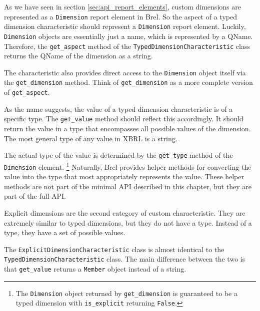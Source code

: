 As we have seen in section \ref{sec:api_report_elements}, custom dimensions are represented as a \texttt{Dimension} report element in Brel.
So the aspect of a typed dimension characteristic should represent a \texttt{Dimension} report element.
Luckily, \texttt{Dimension} objects are essentially just a name, which is represented by a QName.
Therefore, the \texttt{get\_aspect} method of the \texttt{TypedDimensionCharacteristic} class returns the QName of the dimension as a string.

The characteristic also provides direct access to the \texttt{Dimension} object itself via the \texttt{get\_dimension} method.
Think of \texttt{get\_dimension} as a more complete version of \texttt{get\_aspect}.

As the name suggests, the value of a typed dimension characteristic is of a specific type.
The \texttt{get\_value} method should reflect this accordingly.
It should return the value in a type that encompasses all possible values of the dimension.
The most general type of any value in XBRL is a string.

The actual type of the value is determined by the \texttt{get\_type} method of the \texttt{Dimension} element.
\footnote{The \texttt{Dimension} object returned by \texttt{get\_dimension} is guaranteed to be a typed dimension with \texttt{is\_explicit} returning \texttt{False}.}
Naturally, Brel provides helper methods for converting the value into the type that most appropriately represents the value.
These helper methods are not part of the minimal API described in this chapter, but they are part of the full API.

Explicit dimensions are the second category of custom characteristic.
They are extremely similar to typed dimensions, but they do not have a type.
Instead of a type, they have a set of possible values.

The \texttt{ExplicitDimensionCharacteristic} class is almost identical to the \texttt{TypedDimensionCharacteristic} class.
The main difference between the two is that \texttt{get\_value} returns a \texttt{Member} object instead of a string.

